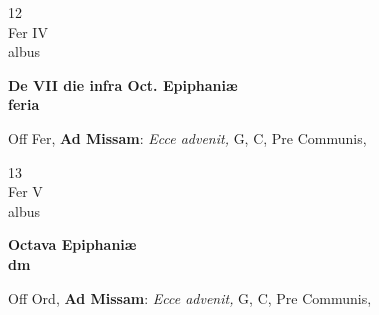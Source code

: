 \documentclass[10pt, openany]{book}
\begin{document}
        \begin{center}
            \begin{minipage}{3.5in}
                \vspace{2em}
                \begin{minipage}{0.5in}
                    {\Huge 12} \\
                    {\normalsize Fer IV} \\
                    {\normalsize albus}
                \end{minipage}
                \begin{minipage}{3.0in}
                    \textbf{ \large De VII die infra Oct. Epiphaniæ \\
                    \textnormal{\normalsize feria}} \\ 
                \end{minipage}
                \begin{justify}Off Fer, \textbf{Ad Missam}: \textit{Ecce advenit,} G, C, Pre Communis,  
                \end{justify}
            \end{minipage}
        \end{center}
    
        \begin{center}
            \begin{minipage}{3.5in}
                \vspace{2em}
                \begin{minipage}{0.5in}
                    {\Huge 13} \\
                    {\normalsize Fer V} \\
                    {\normalsize albus}
                \end{minipage}
                \begin{minipage}{3.0in}
                    \textbf{ \large Octava Epiphaniæ \\
                    \textnormal{\normalsize dm}} \\ 
                \end{minipage}
                \begin{justify}Off Ord, \textbf{Ad Missam}: \textit{Ecce advenit,} G, C, Pre Communis,  
                \end{justify}
            \end{minipage}
        \end{center}
    
\end{document}

